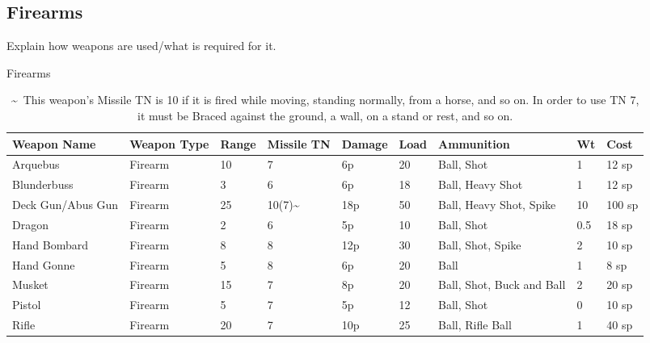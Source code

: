 \documentclass[oneside,11pt,english]{book}
\begin{document}
\subsection{Firearms}
Explain how weapons are used/what is required for it. 
\begin{table}[!hb]
	\caption{Firearms}
	\label{tab:Firearms}
	\begin{tabu} to 
		\rowfont[c]{}Weapon Name & Weapon Type & Range & Missile TN           & Damage & Load & Ammunition                & Wt  & Cost   \\ \toprule
		Arquebus                 & Firearm     & 10    & 7                    & 6p     & 20   & Ball, Shot                & 1   & 12 sp  \\
		Blunderbuss              & Firearm     & 3     & 6                    & 6p     & 18   & Ball, Heavy Shot          & 1   & 12 sp  \\
		Deck Gun/Abus Gun        & Firearm     & 25    & 10(7)\textasciitilde & 18p    & 50   & Ball, Heavy Shot, Spike   & 10  & 100 sp \\
		Dragon                   & Firearm     & 2     & 6                    & 5p     & 10   & Ball, Shot                & 0.5 & 18 sp  \\
		Hand Bombard             & Firearm     & 8     & 8                    & 12p    & 30   & Ball, Shot, Spike         & 2   & 10 sp  \\
		Hand Gonne               & Firearm     & 5     & 8                    & 6p     & 20   & Ball                      & 1   & 8 sp   \\
		Musket                   & Firearm     & 15    & 7                    & 8p     & 20   & Ball, Shot, Buck and Ball & 2   & 20 sp  \\
		Pistol                   & Firearm     & 5     & 7                    & 5p     & 12   & Ball, Shot                & 0   & 10 sp  \\
		Rifle                    & Firearm     & 20    & 7                    & 10p    & 25   & Ball, Rifle Ball          & 1   & 40 sp
	\end{tabu}
\vspace{5pt}\caption*{\textasciitilde~This weapon’s Missile TN is 10 if it is fired while moving, standing normally, from a horse, and so on. In order to use TN 7, it must be Braced against the ground, a wall, on a stand or rest, and so on.}
\end{table}
\end{document}
